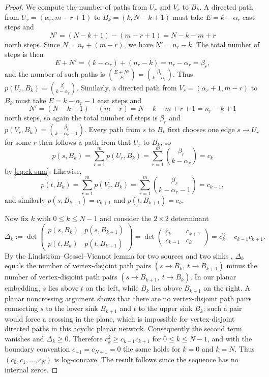 \documentclass[11pt]{amsart}
\numberwithin{equation}{section}
\begin{document}
\begin{proof}
We compute the number of paths from $U_r$ and $V_r$ to $B_k$. A directed path from $U_r=(\alpha_r,m-r+1)$ to $B_k=(k,N-k+1)$ must take $E=k-\alpha_r$ east steps and
\[
N'=(N-k+1)-(m-r+1)=N-k-m+r
\]
north steps. Since $N=n_r+(m-r)$, we have $N'=n_r-k$. The total number of steps is then
\[
E+N'=(k-\alpha_r)+(n_r-k)=n_r-\alpha_r=\beta_r,
\]
and the number of such paths is $\binom{E+N'}{E}=\binom{\beta_r}{k-\alpha_r}$. Thus $p(U_r,B_k)=\binom{\beta_r}{k-\alpha_r}$. Similarly, a directed path from $V_r=(\alpha_r+1,m-r)$ to $B_k$ must take $E=k-\alpha_r-1$ east steps and
\[
N'=(N-k+1)-(m-r)=N-k-m+r+1=n_r-k+1
\]
north steps, so again the total number of steps is $\beta_r$ and $p(V_r,B_k)=\binom{\beta_r}{k-\alpha_r-1}$. Every path from $s$ to $B_k$ first chooses one edge $s\to U_r$ for some $r$ then follows a path from that $U_r$ to $B_k$, so
\[
p(s,B_k)=\sum_{r=1}^m p(U_r,B_k)=\sum_{r=1}^m \binom{\beta_r}{k-\alpha_r}=c_k
\]
by \eqref{eq:ck-sum}. Likewise,
\[
p(t,B_k)=\sum_{r=1}^m p(V_r,B_k)=\sum_{r=1}^m \binom{\beta_r}{k-\alpha_r-1}=c_{k-1},
\]
and similarly $p(s,B_{k+1})=c_{k+1}$ and $p(t,B_{k+1})=c_k$.

Now fix $k$ with $0\le k\le N-1$ and consider the $2\times 2$ determinant
\[
\Delta_k :=
\det\begin{pmatrix}
p(s,B_k) & p(s,B_{k+1})\\
p(t,B_k) & p(t,B_{k+1})
\end{pmatrix}
=
\det\begin{pmatrix}
c_k & c_{k+1}\\
c_{k-1} & c_k
\end{pmatrix}
= c_k^2 - c_{k-1}c_{k+1}.
\]
By the Lindstr\"om--Gessel--Viennot lemma for two sources and two sinks \cite{GesselViennot1985,Lindstrom1973}, $\Delta_k$ equals the number of vertex-disjoint path pairs $(s\to B_k,\ t\to B_{k+1})$ minus the number of vertex-disjoint path pairs $(s\to B_{k+1},\ t\to B_k)$. In our planar embedding, $s$ lies above $t$ on the left, while $B_k$ lies above $B_{k+1}$ on the right. A planar noncrossing argument shows that there are no vertex-disjoint path pairs connecting $s$ to the lower sink $B_{k+1}$ and $t$ to the upper sink $B_k$: such a pair would force a crossing in the plane, which is impossible for vertex-disjoint directed paths in this acyclic planar network. Consequently the second term vanishes and $\Delta_k\ge 0$. Therefore $c_k^2\ge c_{k-1}c_{k+1}$ for $0\le k\le N-1$, and with the boundary convention $c_{-1}=c_{N+1}=0$ the same holds for $k=0$ and $k=N$. Thus $(c_0,c_1,\ldots,c_N)$ is log-concave. The result follows since the sequence has no internal zeros.
\end{proof}
\end{document}
